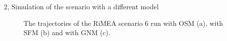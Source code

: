 \documentclass[10pt,a4paper]{article}
\begin{document}
\begin{task}{2, Simulation of the scenario with a different model}
\begin{figure}[H]
    \centering
    \hfill
    \hfill
    \caption{The trajectories of the RiMEA scenario 6 run with OSM (a), with SFM (b) and with GNM (c).}
    \label{fig:rimea6-osm-sfm-gnm}
\end{figure}


\end{task}
\end{document}
